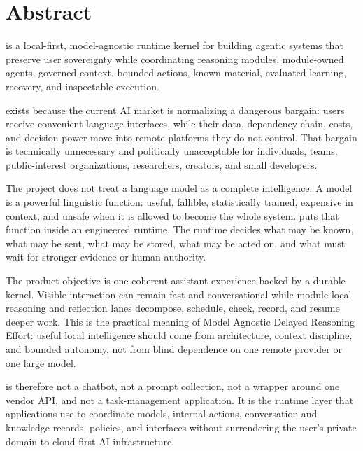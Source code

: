 \documentclass[11pt]{report}
\begin{document}

\section*{Abstract}

\begin{pxQuote}
	\MADRE is a local-first, model-agnostic runtime kernel for building agentic systems that preserve user sovereignty while coordinating reasoning modules, module-owned agents, governed context, bounded actions, known material, evaluated learning, recovery, and inspectable execution.
\end{pxQuote}
\begin{center}
	\madreLogoH*[21em]
\end{center}
\Madre exists because the current AI market is normalizing a dangerous bargain: users receive convenient language interfaces, while their data, dependency chain, costs, and decision power move into remote platforms they do not control. That bargain is technically unnecessary and politically unacceptable for individuals, teams, public-interest organizations, researchers, creators, and small developers.

The project does not treat a language model as a complete intelligence. A model is a powerful linguistic function: useful, fallible, statistically trained, expensive in context, and unsafe when it is allowed to become the whole system. \Madre puts that function inside an engineered runtime. The runtime decides what may be known, what may be sent, what may be stored, what may be acted on, and what must wait for stronger evidence or human authority.

The product objective is one coherent assistant experience backed by a durable kernel. Visible interaction can remain fast and conversational while module-local reasoning and reflection lanes decompose, schedule, check, record, and resume deeper work. This is the practical meaning of Model Agnostic Delayed Reasoning Effort: useful local intelligence should come from architecture, context discipline, and bounded autonomy, not from blind dependence on one remote provider or one large model.

\Madre is therefore not a chatbot, not a prompt collection, not a wrapper around one vendor API, and not a task-management application. It is the runtime layer that applications use to coordinate models, internal actions, conversation and knowledge records, policies, and interfaces without surrendering the user's private domain to cloud-first AI infrastructure.
\end{document}
